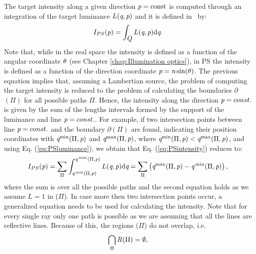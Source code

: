 The target intensity along a given direction $\textit{p}=\textrm{const}$ is computed through an integration of the target luminance $L(\textit{q}, \textit{p})$ and it is defined in $\,$ by:
\begin{equation}
\label{eq:PSintensity}
I_{PS}(\textit{p}) = \int_{\mbox{$\emph{Q}_{\textit{}}$}}L(\textit{q}, \textit{p}) \textrm{d}\textit{q}.
\end{equation}
Note that, while in the real space the intensity is defined as a function of the angular coordinate $\theta$ (see Chapter \ref{chap:Illumination optics}), in PS the intensity is defined as a function of the direction coordinate $\textit{p}=\textit{n}\sin(\theta)$.
The previous equation implies that, assuming a Lambertian source, the problem of computing the target intensity is reduced to the problem of calculating the boundaries
$\partial$$(\Pi)$ for all possible paths $\Pi$. Hence, the intensity along the direction $\textit{p}= const.$ is given by the sum of the lengths intervals formed by the support of the luminance and line $\textit{p}=const.$. For example, if two intersection points between line $\textit{p}=const.$ and the boundary $\partial$$(\Pi)$ are found, indicating their position coordinates with $\textit{q}^\textrm{min}(\Pi,\textit{p})$ and $\textit{q}^\textrm{max}(\Pi,\textit{p})$, where $\textit{q}^\textrm{min}(\Pi,\textit{p})<\textit{q}^\textrm{max}(\Pi,\textit{p})$, and using Eq. (\ref{eq:PSluminance}), we obtain that Eq. (\ref{eq:PSintensity}) reduces to:
\begin{equation}\label{eta2}
I_{PS}(\textit{p}) = \sum_{\Pi}\int_{\textit{q}^\textrm{\,min}(\Pi, \textit{p})}^{\textit{q}^\textrm{\,max}(\Pi,\textit{p})}L(\textit{q}, \textit{p})\textrm{d}\textit{q} = \sum_{\Pi}\big (\textit{q}^\textrm{max}(\Pi,\textit{p})-\textit{q}^\textrm{\,min}(\Pi,\textit{p})\big )\,,
\end{equation}
where the sum is over all the possible paths and the second equation holds as we assume $L=1$ in ($\Pi$). In case more then two intersection points occur, a generalized equation needs to be used for calculating the intensity. 
Note that for every single ray only one path is possible as we are assuming that all the lines are reflective lines.
Because of this, the regions ($\Pi$) do not overlap, i.e.
\begin{equation}
\bigcap_{\Pi}\mbox{$\emph{R}_{\textit{}}$}(\Pi)= \emptyset,
\end{equation}
